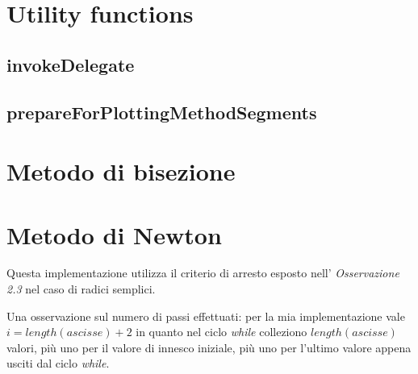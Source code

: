 \section{Utility functions}
\subsection{invokeDelegate}


\subsection{prepareForPlottingMethodSegments}


\section{Metodo di bisezione}
\label{sec:bisectionIterativeMethod}


\section{Metodo di Newton}
\label{sec:newtonIterativeMethod}
Questa implementazione utilizza il criterio di arresto esposto nell'
\emph{Osservazione 2.3} nel caso di radici semplici.

Una osservazione sul numero di passi effettuati: per la mia implementazione
vale $i = length(ascisse) + 2$ in quanto nel ciclo \emph{while} colleziono
$length(ascisse)$ valori, pi\`u uno per il valore di innesco iniziale, pi\`u uno
per l'ultimo valore appena usciti dal ciclo \emph{while}.

